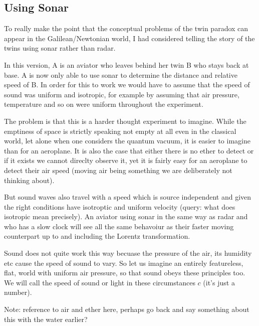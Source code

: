 \documentclass[a4paper]{report}
\begin{document}

\subsection*{Using Sonar}
To really make the point that the conceptual problems of the twin paradox can appear in the Galilean/Newtonian world, I had considered telling the story of the twins using sonar rather than radar.

In this version, A is an aviator who leaves behind her twin B who stays back at base. A is now only able to use sonar to determine the distance and relative speed of B. In order for this to work we would have to assume that the speed of sound was uniform and isotropic, for example by assuming that air pressure, temperature and so on were uniform throughout the experiment.

The problem is that this is a harder thought experiment to imagine. While the emptiness of space is strictly speaking not empty at all even in the classical world, let alone when one considers the quantum vacuum, it is easier to imagine than for an aeroplane. It is also the case that either there is no ether to detect or if it exists we cannot direclty observe it, yet it is fairly easy for an aeroplane to detect their air speed (moving air being something we are deliberately not thinking about).

But sound waves also travel with a speed which is source independent and given the right conditions have isotroptic and uniform velocity (query: what does isotropic mean precisely). An aviator using sonar in the same way as radar and who has a slow clock will see all the same behavoiur as their faster moving counterpart up to and including the Lorentz transformation. 

Sound does not quite work this way becuase the pressure of the air, its humidity etc cause the speed of sound to vary. So let us imagine an entirely featureless, flat, world with uniform air pressure, so that sound obeys these principles too. We will call the speed of sound or light in these circumstances $c$ (it's just a number).

Note: reference to air and ether here, perhaps go back and say something about this with the water earlier?
\end{document}
